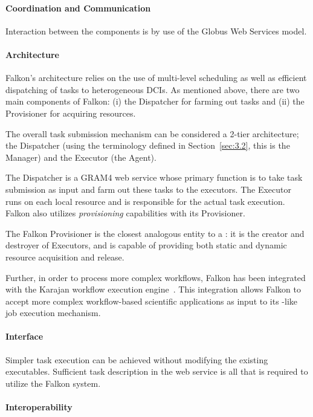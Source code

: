 \documentclass{sig-alternate}
\begin{document}
\paragraph{Coordination and Communication}

Interaction between the components is by use of the Globus Web Services model.

\paragraph{Architecture}

Falkon's architecture relies on the use of multi-level scheduling as well as
efficient dispatching of tasks to heterogeneous DCIs. As mentioned above, there
are two main components of Falkon: (i) the Dispatcher for farming out tasks and
(ii) the Provisioner for acquiring resources.

The overall task submission mechanism can be considered a 2-tier architecture;
the Dispatcher (using the terminology defined in Section~\ref{sec:3.2}, this is
the \pilot Manager) and the Executor (the \pilot Agent).

The Dispatcher is a GRAM4 web service whose primary function is to take task
submission as input and farm out these tasks to the executors. The Executor
runs on each local resource and is responsible for the actual task execution.
Falkon also utilizes \textit{provisioning} capabilities with its Provisioner.

The Falkon Provisioner is the closest analogous entity to a \pilot: it is the
creator and destroyer of Executors, and is capable of providing both static and
dynamic resource acquisition and release.

Further, in order to process more complex workflows, Falkon has been integrated
with the Karajan workflow execution engine~\cite{karajan}. This integration
allows Falkon to accept more complex workflow-based scientific applications as
input to its \pilot-like job execution mechanism.

\paragraph{Interface}

Simpler task execution can be achieved without modifying the existing
executables. Sufficient task description in the web service is all that is
required to utilize the Falkon system.

\paragraph{Interoperability}
\end{document}
